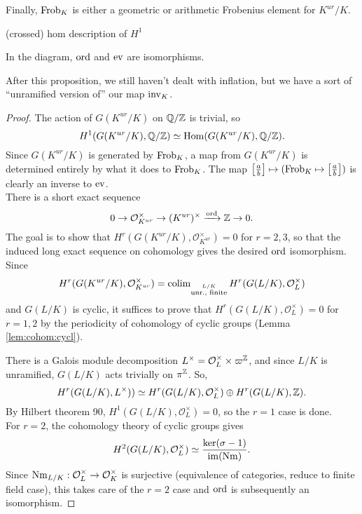 \documentclass[class=article, crop=false]{standalone}
\begin{document}
Finally, $\operatorname{Frob}_K$ is 
either a geometric or arithmetic Frobenius element for $K^{ur}/K$.

{\color{red} (crossed) hom description of \(H^{1}\) }

\begin{proposition} 
	In the diagram, $\operatorname{ord}$ and $\operatorname{ev}$ are isomorphisms.
\end{proposition}

After this proposition, we still haven't dealt with inflation,
but we have a sort of ``unramified version of'' our map \(\operatorname{inv}_{K}\). 


\begin{proof}
	The action of $G(K^{ur}/K)$ on $\mathbb{Q}/\mathbb{Z}$ is trivial, so
	\[
	H^{1}(G(K^{ur}/K),\mathbb{Q}/\mathbb{Z})\simeq\operatorname{Hom}(G(K^{ur}/K),\mathbb{Q}/\mathbb{Z})
	.\] 
	Since $G(K^{ur}/K)$ is generated by $\operatorname{Frob}_K$, a map from $G(K^{ur}/K)$ is determined entirely by what it does to $\operatorname{Frob}_K$. The map $\left[\frac{a}{b}\right]\mapsto(\operatorname{Frob}_K\mapsto\left[\frac{a}{b}\right])$ is clearly an inverse to $\operatorname{ev}$.\\
	There is a short exact sequence
	\[
		0\to\mathcal{O}_{K^{ur}}^{\times}\to(K^{ur})^{\times}\xrightarrow{\operatorname{ord}}\mathbb{Z}\to 0
	.\] 
	The goal is to show that $H^{r}(G(K^{ur}/K),\mathcal{O}_{K^{ur}}^{\times})=0$ for $r=2,3$, so that the induced long exact sequence on cohomology gives the desired $\operatorname{ord}$ isomorphism. Since
	\[
		H^{r}(G(K^{ur}/K),\mathcal{O}_{K^{ur}}^{\times})=\operatorname{colim}_{\stackrel{L/K}{\text{unr., finite}}}H^{r}(G(L/K),\mathcal{O}_L^{\times})
	\] 
	and $G(L/K)$ is cyclic, 
	it suffices to prove that 
	$H^{r}(G(L/K),\mathcal{O}_L^{\times})=0$ 
	for $r=1,2$ by the periodicity of cohomology of cyclic groups
	(Lemma \ref{lem:cohom:cycl}).

	There is a Galois module decomposition $L^{\times}=\mathcal{O}_L^{\times}\times\varpi^{\mathbb{Z}}$, and since $L/K$ is unramified, $G(L/K)$ acts trivially on $\pi^{\mathbb{Z}}$. So,
	\[
		H^{r}(G(L/K),L^{\times}))\simeq H^{r}(G(L/K),\mathcal{O}_L^{\times})\oplus H^{r}(G(L/K),\mathbb{Z})
	.\] 
	By Hilbert theorem 90, $H^{1}(G(L/K),\mathcal{O}_L^{\times})=0$, so the $r=1$ case is done.\\
	For $r=2$, the cohomology theory of cyclic groups gives
	\[
		H^{2}(G(L/K),\mathcal{O}_L^{\times})\simeq\frac{\ker(\sigma-1)}{\mathrm{im}(\mathrm{Nm})}
	.\] 
	Since $\mathrm{Nm}_{L/K}:\mathcal{O}_L^{\times}\to\mathcal{O}_K^{\times}$ 
	is surjective 
	{\color{red} (equivalence of categories, reduce to finite field case)},
	this takes care of the 
	$r=2$ case and $\operatorname{ord}$ is subsequently an isomorphism.
\end{proof}
\end{document}
